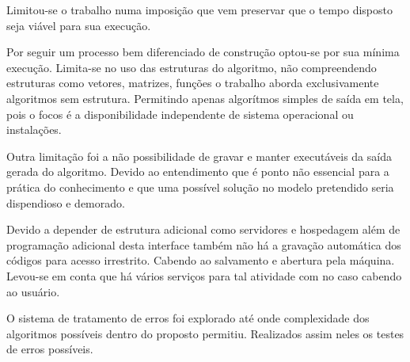 Limitou-se o trabalho numa imposição que vem preservar que o tempo disposto seja viável para sua execução.

Por seguir um processo bem diferenciado de construção optou-se por sua mínima execução. Limita-se no uso das  estruturas do algoritmo, não compreendendo estruturas como vetores, matrizes, funções o trabalho aborda exclusivamente algoritmos sem estrutura. Permitindo apenas algorítmos simples de saída em tela, pois o focos é a disponibilidade independente de sistema operacional ou instalações.

Outra limitação foi a não possibilidade de gravar e manter executáveis da saída gerada do algoritmo. Devido ao entendimento que é ponto não essencial para a prática do conhecimento e que uma possível solução no modelo pretendido seria dispendioso e demorado.

Devido a depender de estrutura adicional como servidores e hospedagem além de programação adicional desta interface também não há a gravação automática dos códigos para acesso irrestrito. Cabendo ao salvamento e abertura pela máquina. Levou-se em conta que há vários serviços para tal atividade com no caso cabendo ao usuário.

O sistema de tratamento de erros foi explorado até onde complexidade dos algoritmos possíveis dentro do proposto permitiu. Realizados assim neles os testes de erros possíveis.
